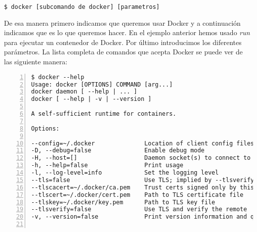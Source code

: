 	\begin{lstlisting}[style=consola]
$ docker [subcomando de docker] [parametros]
	\end{lstlisting}

	De esa manera primero indicamos que queremos usar Docker y a continuación indicamos que es lo que queremos hacer. En el ejemplo anterior hemos usado \textit{run} para ejecutar un contenedor de Docker. Por último introducimos los diferentes parámetros. La lista completa de comandos que acepta Docker se puede ver de las siguiente manera:
	\begin{lstlisting}[style=consola,numbers=left]
$ docker --help
Usage: docker [OPTIONS] COMMAND [arg...]
docker daemon [ --help | ... ]
docker [ --help | -v | --version ]

A self-sufficient runtime for containers.

Options:

--config=~/.docker              Location of client config files
-D, --debug=false               Enable debug mode
-H, --host=[]                   Daemon socket(s) to connect to
-h, --help=false                Print usage
-l, --log-level=info            Set the logging level
--tls=false                     Use TLS; implied by --tlsverify
--tlscacert=~/.docker/ca.pem    Trust certs signed only by this CA
--tlscert=~/.docker/cert.pem    Path to TLS certificate file
--tlskey=~/.docker/key.pem      Path to TLS key file
--tlsverify=false               Use TLS and verify the remote
-v, --version=false             Print version information and quit


\end{lstlisting}
